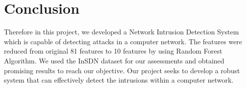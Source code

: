 \section{Conclusion}
\vspace{-18pt}
Therefore in this project, we developed a Network Intrusion Detection System which is capable of detecting attacks in a computer network. The features were reduced from original 81 features to 10 features  by using Random Forest Algorithm. We used the InSDN dataset for our assessments and obtained promising results to reach our objective. Our project seeks to develop a robust system that can effectively detect the intrusions within a computer network.
\newpage
\renewcommand\bibname{References} %

